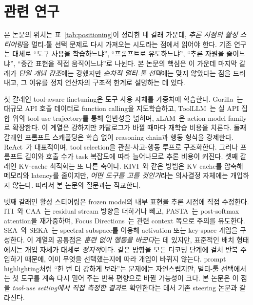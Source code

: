 \section{관련 연구}\label{sec:related}

본 논문의 위치는 표~\ref{tab:positioning}이 정리한 네 갈래 가운데, \emph{추론 시점의 활성 스티어링}을 멀티-툴 선택 문제로 다시 가져오는 시도라는 점에서 읽어야 한다. 기존 연구는 대체로 ``도구 사용을 학습하느냐'', ``프롬프트로 유도하느냐'', ``추론 자원을 줄이느냐'', ``중간 표현을 직접 움직이느냐''로 나뉜다. 본 논문의 핵심은 이 가운데 마지막 갈래가 \emph{단일 개념 강조}에는 강했지만 \emph{순차적 멀티-툴 선택}에는 맞지 않았다는 점을 드러내고, 그 이유를 정지 연산자의 구조적 한계로 설명하는 데 있다.

첫 갈래인 tool-aware finetuning은 도구 사용 자체를 가중치에 학습한다. Gorilla~\citep{patil2023gorilla}는 대규모 API 호출 데이터로 function calling을 지도학습하고, ToolLLM~\citep{qin2024toolllm}는 실 API 집합 위의 tool-use trajectory를 통해 일반성을 넓히며, xLAM~\citep{zhang2024xlam}은 action model family로 확장한다. 이 계열은 강하지만 카탈로그가 바뀔 때마다 재학습 비용을 치른다. 둘째 갈래인 프롬프트 스캐폴딩은 학습 없이 reasoning chain과 행동 형식을 강제한다. ReAct~\citep{yao2023react}가 대표적이며, tool selection을 관찰-사고-행동 루프로 구조화한다. 그러나 프롬프트 길이와 호출 수가 task 복잡도에 따라 늘어나므로 추론 비용이 커진다. 셋째 갈래인 KV-cache 최적화는 또 다른 축이다. KIVI~\citep{liu2024kivi}와 같은 방법은 KV cache를 압축해 메모리와 latency를 줄이지만, \emph{어떤 도구를 고를 것인가}라는 의사결정 자체에는 개입하지 않는다. 따라서 본 논문의 질문과는 직교한다.

넷째 갈래인 활성 스티어링은 frozen model의 내부 표현을 추론 시점에 직접 수정한다. ITI~\citep{li2023iti}와 CAA~\citep{rimsky2024caa}는 residual stream 방향을 더하거나 빼고, PASTA~\citep{zhang2024pasta}는 post-softmax attention을 재가중하며, Focus Directions~\citep{zhu2025focusdirections}는 관련 context 쪽으로 주의를 유도한다. SEA~\citep{qiu2024sea}와 SEKA~\citep{li2026seka}는 spectral subspace를 이용해 activation 또는 key-space 개입을 구성한다. 이 계열의 공통점은 \emph{훈련 없이 행동을 바꾼다}는 데 있지만, 표준적인 배치 형태에서는 개입 자체가 대체로 \emph{정지적}이다. 같은 방향을 모든 디코딩 단계에 걸쳐 반복 주입하기 때문에, 이미 무엇을 선택했는지에 따라 개입이 바뀌지 않는다. prompt highlighting처럼 ``한 번 더 강하게 보라''는 문제에는 자연스럽지만, 멀티-툴 선택에서는 첫 도구를 계속 다시 밀어 주는 반복 편향으로 바뀔 가능성이 크다. 본 논문은 이 점을 \emph{tool-use setting에서 직접 측정한 결과}로 확인한다는 데서 기존 steering 논문과 갈라진다.

